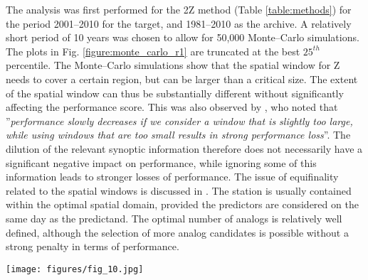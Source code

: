 \documentclass[review]{elsarticle}
\begin{document}
The analysis was first performed for the 2Z method (Table \ref{table:methods}) for the period 2001--2010 for the target, and 1981--2010 as the archive. A relatively short period of 10 years was chosen to allow for 50,000 Monte--Carlo simulations. The plots in Fig. \ref{figure:monte_carlo_r1} are truncated at the best $25^{th}$ percentile. The Monte--Carlo simulations show that the spatial window for Z needs to cover a certain region, but can be larger than a critical size. The extent of the spatial window can thus be substantially different without significantly affecting the performance score. This was also observed by \citet{Bontron2004}, who noted that ''\textit{performance slowly decreases if we consider a window that is slightly too large, while using windows that are too small results in strong performance loss}''. The dilution of the relevant synoptic information therefore does not necessarily have a significant negative impact on performance, while ignoring some of this information leads to stronger losses of performance. The issue of equifinality related to the spatial windows is discussed in \cite{Radanovics2013}. The station is usually contained within the optimal spatial domain, provided the predictors are considered on the same day as the predictand. The optimal number of analogs is relatively well defined, although the selection of more analog candidates is possible without a strong penalty in terms of performance.

\begin{figure*}[hbt!]
	\texttt{[image: figures/fig\_10.jpg]}
	\caption{Example of parameter values for 2Z (Table \ref{table:methods}) for the precipitation at the Binn station (Fig. \ref{figure:variable_exploration}) on the period 2001--2010. The parameters are the extent (min/max longitude/latitude) of the spatial windows for the geopotential height at 500 and 1000~hPa, and the number of analogs. The green vertical bar in the plots represents the location of the station. The circles represent random parameters from the Monte--Carlo analysis. The plots are truncated at the $25^{th}$ best percentiles for 50,000 realizations. Squares are the results of the sequential calibration and triangles result from genetic algorithms. Markers in blue represent parameters optimized for the period 1981--2000 and applied to 2001--2010. Markers in red represent parameters optimized directly for the period 2001--2010.}
	\label{figure:monte_carlo_r1}
\end{figure*}
\end{document}
